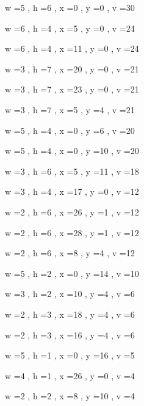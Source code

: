 \documentclass[11pt]{article}
\begin{document}


w =5 , h =6 , x =0 , y =0 , v =30
\par
w =6 , h =4 , x =5 , y =0 , v =24
\par
w =6 , h =4 , x =11 , y =0 , v =24
\par
w =3 , h =7 , x =20 , y =0 , v =21
\par
w =3 , h =7 , x =23 , y =0 , v =21
\par
w =3 , h =7 , x =5 , y =4 , v =21
\par
w =5 , h =4 , x =0 , y =6 , v =20
\par
w =5 , h =4 , x =0 , y =10 , v =20
\par
w =3 , h =6 , x =5 , y =11 , v =18
\par
w =3 , h =4 , x =17 , y =0 , v =12
\par
w =2 , h =6 , x =26 , y =1 , v =12
\par
w =2 , h =6 , x =28 , y =1 , v =12
\par
w =2 , h =6 , x =8 , y =4 , v =12
\par
w =5 , h =2 , x =0 , y =14 , v =10
\par
w =3 , h =2 , x =10 , y =4 , v =6
\par
w =2 , h =3 , x =18 , y =4 , v =6
\par
w =2 , h =3 , x =16 , y =4 , v =6
\par
w =5 , h =1 , x =0 , y =16 , v =5
\par
w =4 , h =1 , x =26 , y =0 , v =4
\par
w =2 , h =2 , x =8 , y =10 , v =4
\par
\newpage
\end{document}
